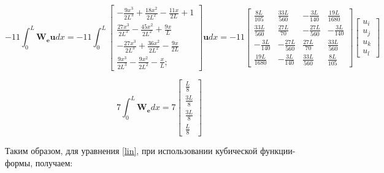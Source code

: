 $$  -11  
\int_0^L \mathbf{W_e} \mathbf{u} d x=
 -11  
\int_0^L \begin{bmatrix}
-\frac{9x^3}{2L^3}+\frac{18x^2}{2L^2}-\frac{11x}{2L} + 1\\
\frac{27x^3}{2L^3}-\frac{45x^2}{2L^2}+\frac{9x}{L}\\
-\frac{27x^3}{2L^3}+\frac{36x^2}{2L^2}-\frac{9x}{2L}\\
\frac{9x^3}{2L^3}-\frac{9x^2}{2L^2}-\frac{x}{L};
\end{bmatrix} \mathbf{u} d x=
 -11  
\begin{bmatrix}
\frac{8L}{105} & \frac{33L}{560} & -\frac{3L}{140} & \frac{19L}{1680}\\
\frac{33L}{560} & \frac{27L}{70} & -\frac{27L}{560} & -\frac{3L}{140} \\
-\frac{3L}{140} & -\frac{27L}{560} & \frac{27L}{70} & \frac{33L}{560} \\
\frac{19L}{1680} & -\frac{3L}{140} & \frac{33L}{560} & \frac{8L}{105}
\end{bmatrix}
\begin{bmatrix}
u_i \\
u_j \\
u_k\\
u_l
\end{bmatrix}$$


$$
7 \int_0^L \mathbf{W_e} d x
=
7
\begin{bmatrix}
	\frac{L}{8} \\
	\frac{3L}{8}\\
	\frac{3L}{8}\\
	\frac{L}{8}
\end{bmatrix}
$$

\newpage
Таким образом, для уравнения \ref{lin}, при использовании кубической функции-формы,  получаем:

